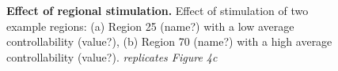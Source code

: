 \begin{figure}
 \caption{\textbf{Effect of regional stimulation.} Effect of stimulation of two example regions: (a) Region 25 (name?) with a low average controllability (value?),
 (b) Region 70 (name?) with a high average controllability (value?). \textit{replicates Figure 4c}} 
 \label{fig:functional-effect-examples}
\end{figure}



